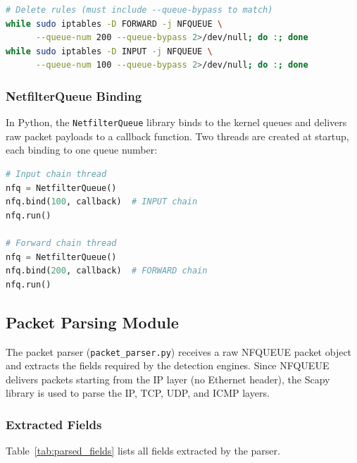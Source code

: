 \documentclass[12pt,a4paper]{article}
\begin{document}
\begin{lstlisting}[language=bash]
# Delete rules (must include --queue-bypass to match)
while sudo iptables -D FORWARD -j NFQUEUE \
      --queue-num 200 --queue-bypass 2>/dev/null; do :; done
while sudo iptables -D INPUT -j NFQUEUE \
      --queue-num 100 --queue-bypass 2>/dev/null; do :; done
\end{lstlisting}

\subsubsection{NetfilterQueue Binding}

In Python, the \texttt{NetfilterQueue} library binds to the kernel queues and delivers raw packet payloads to a callback function. Two threads are created at startup, each binding to one queue number:

\begin{lstlisting}[language=python]
# Input chain thread
nfq = NetfilterQueue()
nfq.bind(100, callback)  # INPUT chain
nfq.run()

# Forward chain thread
nfq = NetfilterQueue()
nfq.bind(200, callback)  # FORWARD chain
nfq.run()
\end{lstlisting}

\subsection{Packet Parsing Module}
\label{sec:parsing}

The packet parser (\texttt{packet\_parser.py}) receives a raw NFQUEUE packet object and extracts the fields required by the detection engines. Since NFQUEUE delivers packets starting from the IP layer (no Ethernet header), the Scapy library is used to parse the IP, TCP, UDP, and ICMP layers.

\subsubsection{Extracted Fields}

Table~\ref{tab:parsed_fields} lists all fields extracted by the parser.
\end{document}
